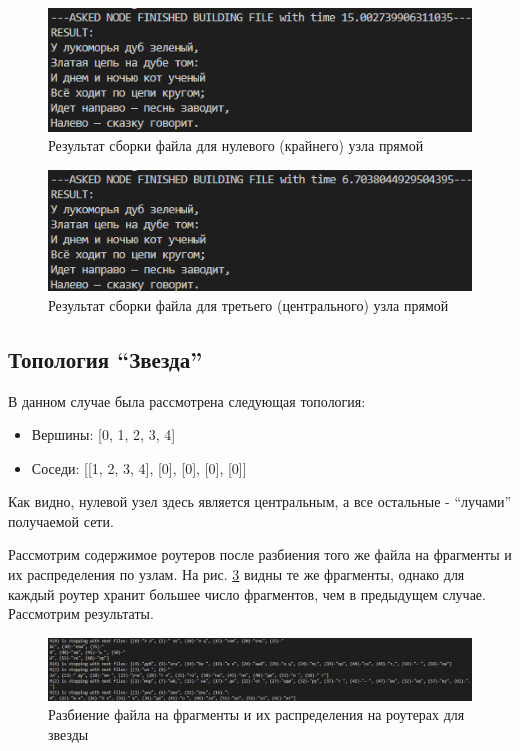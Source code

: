 \begin{figure}[H]
    \centering
    \includegraphics[width=0.88\linewidth]{imgs/lin-res-0.png}
    \caption{Результат сборки файла для нулевого (крайнего) узла прямой}
    \label{fig:lin-res-0}
\end{figure}

\begin{figure}[H]
    \centering
    \includegraphics[width=0.88\linewidth]{imgs/lin-res-3.png}
    \caption{Результат сборки файла для третьего (центрального) узла прямой}
    \label{fig:lin-res-3}
\end{figure}

\subsection{Топология ``Звезда''}

В данном случае была рассмотрена следующая топология:
\begin{itemize}
    \item Вершины: [0, 1, 2, 3, 4]
    \item Соседи: [[1, 2, 3, 4], [0], [0], [0], [0]]
\end{itemize}
Как видно, нулевой узел здесь является центральным, а все остальные - ``лучами'' получаемой сети.

Рассмотрим содержимое роутеров после разбиения того же файла на фрагменты и их распределения по узлам. На рис. \ref{fig:star-files} видны те же фрагменты, однако для каждый роутер хранит большее число фрагментов, чем в предыдущем случае. Рассмотрим результаты.

\begin{figure}[H]
    \centering
    \includegraphics[width=0.88\linewidth]{imgs/star-files.png}
    \caption{Разбиение файла на фрагменты и их распределения на роутерах для звезды}
    \label{fig:star-files}
\end{figure}

